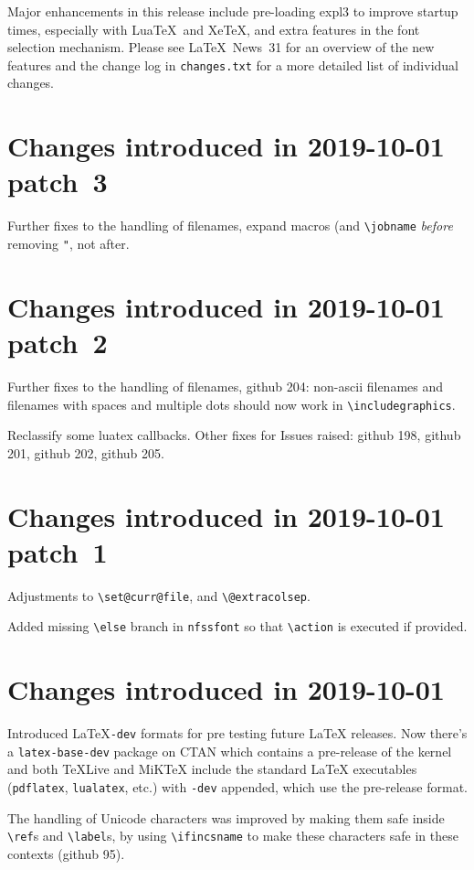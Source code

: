 \documentclass{ltxguide}
\newcommand\Lpack[1]{\mbox{\textsf{#1}}}
\newcommand\ghissue[1]{github #1}
\newcommand\ltnewsissue[1]{\LaTeX\ News~#1}
\newcommand\ghissue[1]{%
    \href{https://github.com/latex3/latex2e/issues/#1}{github #1}}
\newcommand\ltnewsissue[1]{%
    \href{https://www.latex-project.org/news/latex2e-news/ltnews#1.pdf}{\LaTeX\ News~#1}}
\begin{document}
Major enhancements in this release include pre-loading \Lpack{expl3}
to improve startup times, especially with Lua\TeX\ and Xe\TeX, and
extra features in the font selection mechanism. Please see
\ltnewsissue{31}  for an overview of the new features and the change
log in \texttt{changes.txt} for a more detailed list of individual
changes.


\section{Changes introduced in 2019-10-01 patch~3}

Further fixes to the handling of filenames, expand macros (and
\verb|\jobname| \emph{before} removing \verb|"|, not after.

\section{Changes introduced in 2019-10-01 patch~2}

Further fixes to the handling of filenames, \ghissue{204}: non-ascii
filenames and filenames with spaces and multiple dots should now work
in \verb|\includegraphics|.

Reclassify some luatex callbacks.  Other fixes for Issues raised:
\ghissue{198}, \ghissue{201}, \ghissue{202}, \ghissue{205}.

\section{Changes introduced in 2019-10-01 patch~1}

Adjustments to \verb|\set@curr@file|, and \verb|\@extracolsep|.

Added missing \verb=\else= branch in \texttt{nfssfont} so that
\verb=\action= is executed if provided.

\section{Changes introduced in 2019-10-01}

Introduced \LaTeX\texttt{-dev} formats for pre testing future \LaTeX{}
releases. Now there's a \texttt{latex-base-dev} package on CTAN which
contains a pre-release of the \LaTeXe{} kernel and both \TeX Live and
MiK\TeX{} include the standard \LaTeX{} executables (\texttt{pdflatex},
\texttt{lualatex}, etc.) with \texttt{-dev} appended, which use the
pre-release format.

The handling of Unicode characters was improved by making them safe
inside \verb|\ref|s and \verb|\label|s, by using \verb|\ifincsname|
to make these characters safe in these contexts (\ghissue{95}).
\end{document}
